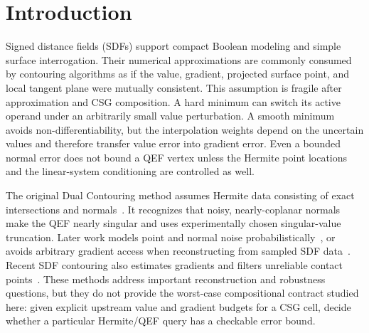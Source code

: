 \documentclass[11pt]{article}
\theoremstyle{definition}
\begin{document}
\begin{abstract}
that the observed non-certification gap is almost entirely certificate slack.
On a frozen corpus of 528 STEP files, OpenCascade imports and validates every
solid subset; a no-healing mesh gate admits 511 models.  A standalone
regular-grid Dual Contouring pipeline completes 118 of 122 selected models and
audits 162,216 active QEF cells with zero complete-bound violations.  Its
22.73\% coverage is explicitly oracle-diagnostic because the CAD files do not
provide certified upstream value and gradient budgets.
The result is a verifiable cell-level interface for future
certified contouring, not a claim that arbitrary sampled or neural fields
already provide the required upstream budgets.
\end{abstract}

\section{Introduction}

Signed distance fields (SDFs) support compact Boolean modeling and simple
surface interrogation.  Their numerical approximations are commonly consumed
by contouring algorithms as if the value, gradient, projected surface point,
and local tangent plane were mutually consistent.  This assumption is fragile
after approximation and CSG composition.  A hard minimum can switch its active
operand under an arbitrarily small value perturbation.  A smooth minimum avoids
non-differentiability, but the interpolation weights depend on the uncertain
values and therefore transfer value error into gradient error.  Even a bounded
normal error does not bound a QEF vertex unless the Hermite point locations and
the linear-system conditioning are controlled as well.

The original Dual Contouring method assumes Hermite data consisting of exact
intersections and normals~\cite{ju2002dual}.  It recognizes that noisy,
nearly-coplanar normals make the QEF nearly singular and uses experimentally
chosen singular-value truncation.  Later work models point and normal noise
probabilistically~\cite{trettner2020probabilistic}, or avoids arbitrary gradient
access when reconstructing from sampled SDF data~\cite{carrera2026dual}.
Recent SDF contouring also estimates gradients and filters unreliable contact
points~\cite{kohlbrenner2026gradients}.  These methods address important
reconstruction and robustness questions, but they do not provide the
worst-case compositional contract studied here: given explicit upstream value
and gradient budgets for a CSG cell, decide whether a particular Hermite/QEF
query has a checkable error bound.
\end{document}
